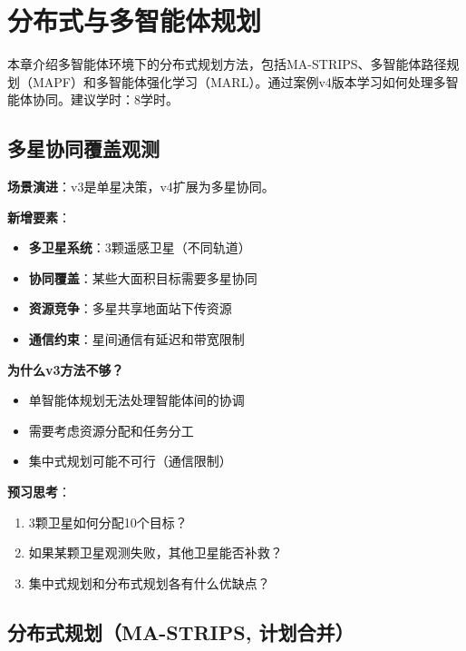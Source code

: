 \chapter{分布式与多智能体规划}

\begin{levelbox}
本章介绍多智能体环境下的分布式规划方法，包括MA-STRIPS、多智能体路径规划（MAPF）和多智能体强化学习（MARL）。通过案例v4版本学习如何处理多智能体协同。建议学时：8学时。
\end{levelbox}

\section{多星协同覆盖观测}

\begin{caseboxA}
\textbf{场景演进}：v3是单星决策，v4扩展为多星协同。

\textbf{新增要素}：
\begin{itemize}
  \item \textbf{多卫星系统}：3颗遥感卫星（不同轨道）
  \item \textbf{协同覆盖}：某些大面积目标需要多星协同
  \item \textbf{资源竞争}：多星共享地面站下传资源
  \item \textbf{通信约束}：星间通信有延迟和带宽限制
\end{itemize}

\textbf{为什么v3方法不够？}
\begin{itemize}
  \item 单智能体规划无法处理智能体间的协调
  \item 需要考虑资源分配和任务分工
  \item 集中式规划可能不可行（通信限制）
\end{itemize}

\textbf{预习思考}：
\begin{enumerate}
  \item 3颗卫星如何分配10个目标？
  \item 如果某颗卫星观测失败，其他卫星能否补救？
  \item 集中式规划和分布式规划各有什么优缺点？
\end{enumerate}
\end{caseboxA}

\section{分布式规划（MA-STRIPS, 计划合并）}

